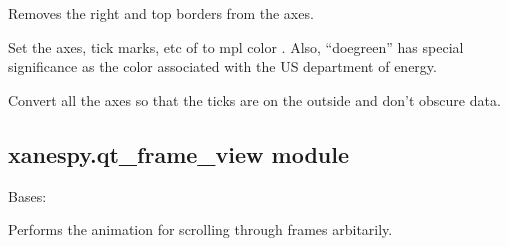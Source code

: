 \documentclass[letterpaper,10pt,english]{sphinxmanual}
\begin{document}

\begin{fulllineitems}
\label{\detokenize{xanespy:xanespy.plots.remove_extra_spines}}
Removes the right and top borders from the axes.

\end{fulllineitems}


\begin{fulllineitems}
\label{\detokenize{xanespy:xanespy.plots.set_axes_color}}
Set the axes, tick marks, etc of  to mpl color . Also,
``doegreen'' has special significance as the color associated with the
US department of energy.

\end{fulllineitems}


\begin{fulllineitems}
\label{\detokenize{xanespy:xanespy.plots.set_outside_ticks}}
Convert all the axes so that the ticks are on the outside and don't
obscure data.

\end{fulllineitems}



\subsection{xanespy.qt\_frame\_view module}
\label{\detokenize{xanespy:xanespy-qt-frame-view-module}}\label{\detokenize{xanespy:module-xanespy.qt_frame_view}}

\begin{fulllineitems}
\label{\detokenize{xanespy:xanespy.qt_frame_view.FrameAnimation}}
Bases: 

Performs the animation for scrolling through frames arbitarily.

\begin{fulllineitems}
\label{\detokenize{xanespy:xanespy.qt_frame_view.FrameAnimation.stop}}
\end{fulllineitems}


\end{fulllineitems}
\end{document}
